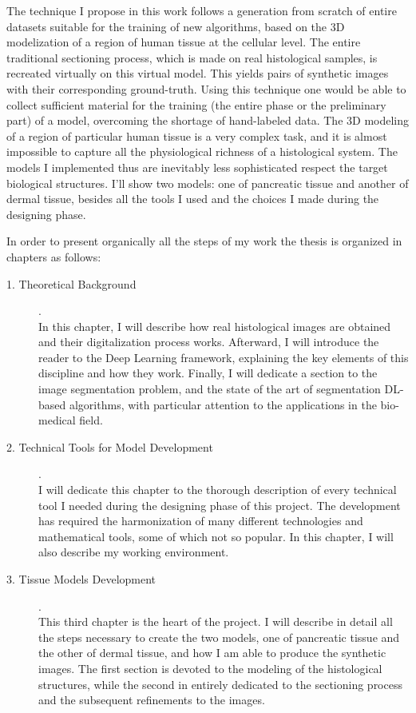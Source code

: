 The technique I propose in this work follows a generation from scratch of entire datasets suitable for the training of new algorithms, based on the 3D modelization of a region of human tissue at the cellular level. The entire traditional sectioning process, which is made on real histological samples, is recreated virtually on this virtual model. This yields pairs of synthetic images with their corresponding ground-truth. Using this technique one would be able to collect sufficient material for the training (the entire phase or the preliminary part) of a model, overcoming the shortage of hand-labeled data. The 3D modeling of a region of particular human tissue is a very complex task, and it is almost impossible to capture all the physiological richness of a histological system. The models I implemented thus are inevitably less sophisticated respect the target biological structures. I'll show two models: one of pancreatic tissue and another of dermal tissue, besides all the tools I used and the choices I made during the designing phase.

In order to present organically all the steps of my work the thesis is organized in chapters as follows:

\begin{description}
    \item [1. Theoretical Background]. \hfill \\
    In this chapter, I will describe how real histological images are obtained and their digitalization process works. Afterward, I will introduce the reader to the Deep Learning framework, explaining the key elements of this discipline and how they work. Finally, I will dedicate a section to the image segmentation problem, and the state of the art of segmentation DL-based algorithms, with particular attention to the applications in the bio-medical field.

    \item [2. Technical Tools for Model Development]. \hfill \\
    I will dedicate this chapter to the thorough description of every technical tool I needed during the designing phase of this project. The development has required the harmonization of many different technologies and mathematical tools, some of which not so popular. In this chapter, I will also describe my working environment.

    \item [3. Tissue Models Development]. \hfill \\
    This third chapter is the heart of the project. I will describe in detail all the steps necessary to create the two models, one of pancreatic tissue and the other of dermal tissue, and how I am able to produce the synthetic images. The first section is devoted to the modeling of the histological structures, while the second in entirely dedicated to the sectioning process and the subsequent refinements to the images.
\end{description}
